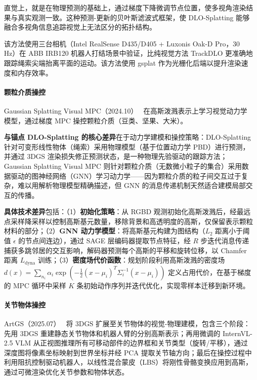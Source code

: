 直觉上，就是在物理预测的基础上，通过梯度下降微调节点位置，使多视角渲染结果与真实观测一致。这种预测-更新的贝叶斯滤波式框架，使 DLO-Splatting 能够融合多视角信息追踪视觉上无法区分的拓扑结构。

该方法使用三台相机（Intel RealSense D435/D405 + Luxonis Oak-D Pro，30 Hz）在 ABB IRB120 机器人打结场景中验证，比纯视觉方法 TrackDLO 更准确地跟踪绳索尖端抬离平面的运动。该方法使用 gsplat 作为光栅化后端以提升渲染速度和内存效率。

\paragraph{颗粒介质操控}

Gaussian Splatting Visual MPC（2024.10）~\cite{2410_09740} 在高斯泼溅表示上学习视觉动力学模型，通过梯度 MPC 操控颗粒介质（豆类、坚果、大米）。

\textbf{与锚点 DLO-Splatting 的核心差异}在于动力学建模和操控策略：DLO-Splatting 针对可变形线性物体（绳索）采用物理模型（基于位置动力学 PBD）进行预测，并通过 3DGS 渲染损失修正预测状态，是一种物理先验驱动的跟踪方法；Gaussian Splatting Visual MPC 则针对颗粒介质（无数微小粒子的集合）采用数据驱动的图神经网络（GNN）学习动力学——因为颗粒介质的粒子间交互过于复杂，难以用解析物理模型精确描述，但 GNN 的消息传递机制天然适合建模局部交互的传播。

\textbf{具体技术差异}包括：（1）\textbf{初始化策略}：从 RGBD 观测初始化高斯泼溅后，经最远点采样降采样以控制高斯基元数量，移除背景和高透明度的高斯，仅保留表示颗粒材料的部分；（2）\textbf{GNN 动力学模型}：将高斯基元构建为图结构（$L_2$ 距离小于阈值 $\epsilon$ 的节点间连边），通过 SAGE 层编码器提取节点特征，经 $R$ 步迭代消息传递捕获多跳邻居的交互影响，解码器预测每个高斯的平移和旋转位移，以 Chamfer 距离 $L_\text{dyna}$ 训练；（3）\textbf{密度场代价函数}：规划阶段利用高斯泼溅的密度场 $d(x) = \sum_{n_i} \alpha_i \exp(-\frac{1}{2}(x-\mu_i)^T \Sigma_i^{-1}(x-\mu_i))$ 定义占用代价，在基于梯度的 MPC 循环中采样 $K$ 条初始动作序列并迭代优化，实现零样本迁移到新环境。

\paragraph{关节物体操控}

ArtGS（2025.07）~\cite{2507_02600} 将 3DGS 扩展至关节物体的视觉-物理建模，包含三个阶段：先用 3DGS 重建静态关节物体和机器人臂的分别高斯表示；再用微调的 InternVL-2.5 VLM 从正视图推理所有可移动部件的边界框和关节类型（旋转/平移），通过深度图将像素坐标映射到世界坐标并经 PCA 提取关节轴方向；最后在操控过程中利用阻抗控制驱动机器人，以线性混合蒙皮（LBS）将刚性骨骼变换应用到高斯，通过可微渲染优化关节参数和物体状态。

